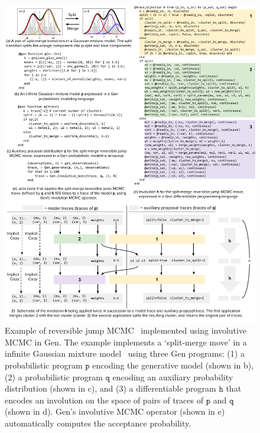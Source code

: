 \documentclass[twoside]{article}
\begin{document}
\begin{figure}[ht]
    \centering
    \includegraphics[width=\textwidth]{figures/mixture.pdf}
    \caption{
Example of reversible jump MCMC~\citep{green1995reversible} implemented using involutive MCMC in Gen.
The example implements a `split-merge move' in a infinite Gaussian mixture model~\citep{richardson1997bayesian} using three Gen programs:
(1) a probabilistic program $\mathtt{p}$ encoding the generative model (shown in b),
(2) a probabilistic program $\mathtt{q}$ encoding an auxiliary probability distribution (shown in c),
and (3) a differentiable program $\mathtt{h}$ that encodes an involution on the space of pairs of traces of $\mathtt{p}$ and $\mathtt{q}$ (shown in d).
Gen's involutive MCMC operator (shown in e) automatically computes the acceptance probability.
}
    \label{fig:mixture}
\end{figure}
\end{document}
